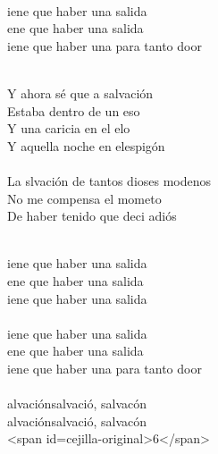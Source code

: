 \begin{cancion}
\jump\\
	iene que haber una salida\\
	ene que haber una salida\\
	iene que haber una para tanto door\\\jump\\
	\begin{chorus}%
	Y ahora sé que a salvación\\
	Estaba dentro de un eso\\
	Y una caricia en el elo\\
	Y aquella noche en elespigón\\
\jump\\
	La slvación de tantos dioses modenos\\
	No me compensa el mometo\\
	De haber tenido que deci adiós\\
	\end{chorus}%
	\jump\\
	iene que haber una salida\\
	ene que haber una salida\\
	iene que haber una salida\\
\jump\\
	iene que haber una salida\\
	ene que haber una salida\\
	iene que haber una para tanto door\\
\jump\\
	alvaciónsalvació, salvacón\\
	alvaciónsalvació, salvacón\\
<span id=cejilla-original>6</span>\\
\end{cancion}%
